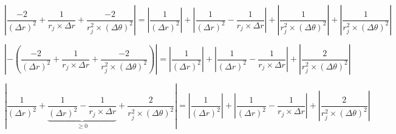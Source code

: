 \begin{equation}
 \left | \frac{-2}{(\Delta r)^2} + \frac{1}{r_j \times \Delta r} + \frac{-2}{r_j^2 \times (\Delta \theta)^2} \right | = \left | \frac{1}{(\Delta r)^2} \right | + \left | \frac{1}{(\Delta r)^2} - \frac{1}{r_j \times \Delta r} \right | + \left | \frac{1}{r_j^2 \times (\Delta \theta)^2} \right | + \left | \frac{1}{r_j^2 \times (\Delta \theta)^2} \right |
\end{equation}

\begin{equation}
 \left | -\left ( \frac{-2}{(\Delta r)^2} + \frac{1}{r_j \times \Delta r} + \frac{-2}{r_j^2 \times (\Delta \theta)^2} \right ) \right | = \left | \frac{1}{(\Delta r)^2} \right | + \left | \frac{1}{(\Delta r)^2} - \frac{1}{r_j \times \Delta r} \right | + \left | \frac{2}{r_j^2 \times (\Delta \theta)^2} \right | 
\end{equation}

\begin{equation}
 \left | \frac{1}{(\Delta r)^2} + \underbrace{\frac{1}{(\Delta r)^2} - \frac{1}{r_j \times \Delta r}}_{ \geq 0} + \frac{2}{r_j^2 \times (\Delta \theta)^2} \right | = \left | \frac{1}{(\Delta r)^2} \right | + \left | \frac{1}{(\Delta r)^2} - \frac{1}{r_j \times \Delta r} \right | +  \left | \frac{2}{r_j^2 \times (\Delta \theta)^2} \right |
\end{equation}

